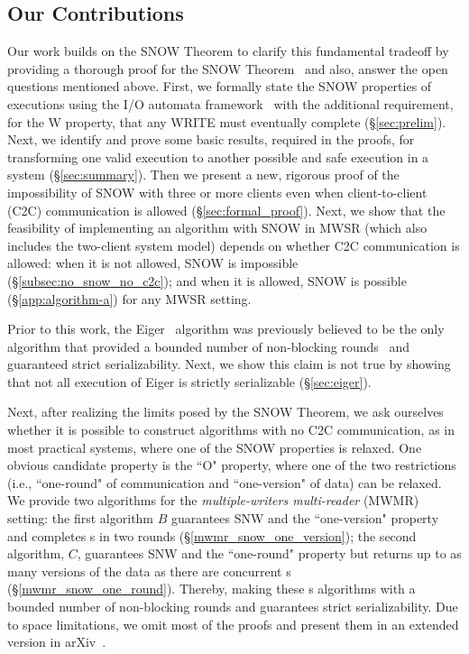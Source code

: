 \subsection{Our Contributions}
Our work builds on the SNOW Theorem to clarify this fundamental tradeoff by providing a thorough proof for the SNOW Theorem~\cite{SNOW2016} and also, answer the open questions mentioned above. 
First, we formally state the SNOW properties of executions using the I/O automata framework~\cite{Lynch1996}  with the additional requirement, for the W property, that any WRITE must eventually complete (\S\ref{sec:prelim}). Next, we identify and prove some basic results, required in the proofs, for transforming one valid execution to another possible and safe execution in a \rot{} system (\S\ref{sec:summary}). 
Then we present a new, rigorous proof of the impossibility of SNOW with three or more clients even when client-to-client (C2C) communication is allowed (\S\ref{sec:formal_proof}).
Next, we show that the feasibility of implementing an algorithm with SNOW in MWSR (which also includes the two-client system model) depends on whether C2C communication is allowed:
when it is not allowed, SNOW is impossible (\S\ref{subsec:no_snow_no_c2c}); and when it is allowed, SNOW is possible (\S\ref{app:algorithm-a}) for any MWSR setting.

Prior to this work, the Eiger~\cite{Lloyd:nsdi2013} algorithm was previously believed to be the only algorithm that provided a bounded number of non-blocking rounds~\cite{Lloyd:nsdi2013} and guaranteed strict serializability. 
Next, we show this claim is not true by showing that not all execution of Eiger is strictly serializable (\S\ref{sec:eiger}).

Next, after realizing the limits posed by the SNOW Theorem, we ask ourselves whether it is possible to construct \rot{} algorithms with no C2C communication, as in most practical systems, where one of the SNOW properties is relaxed. One obvious candidate property is the ``O" property, where one of the two restrictions (i.e., ``one-round" of communication and ``one-version" of data) can be relaxed. We provide two algorithms for the \emph{multiple-writers multi-reader} (MWMR) setting: the first algorithm $B$ guarantees SNW and the ``one-version" property and completes \rot{}s in two rounds (\S\ref{mwmr_snow_one_version}); the second algorithm, $C$, guarantees SNW and the ``one-round" property but returns up to as many versions of the data as there are concurrent \wot{}s
(\S\ref{mwmr_snow_one_round}). Thereby, making these \rot{}s algorithms with a bounded number of non-blocking rounds and guarantees strict serializability. 
%
Due to space limitations, we omit most of the proofs and present them in an extended version in arXiv~\cite{konwar2018snow}.

